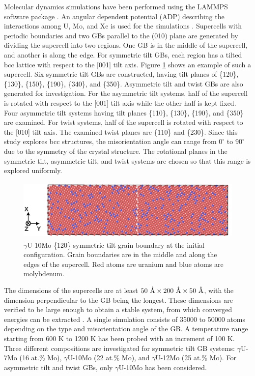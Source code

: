 \documentclass{elsarticle}
\begin{document}
Molecular dynamics simulations have been performed using the LAMMPS software package \cite{lammps}. An angular dependent potential (ADP) describing the interactions among U, Mo, and Xe is used for the simulations \cite{starikov2018, beelerUMoXe}. Supercells with periodic boundaries and two GBs parallel to the (010) plane are generated by dividing the supercell into two regions. One GB is in the middle of the supercell, and another is along the edge. For symmetric tilt GBs, each region has a tilted bcc lattice with respect to the [001] tilt axis. Figure \ref{fig:gb} shows an example of such a supercell. Six symmetric tilt GBs are constructed, having tilt planes of \{120\}, \{130\}, \{150\}, \{190\}, \{340\}, and \{350\}. Asymmetric tilt and twist GBs are also generated for investigation. For the asymmetric tilt systems, half of the supercell is rotated with respect to the [001] tilt axis while the other half is kept fixed. Four asymmetric tilt systems having tilt planes \{110\}, \{130\}, \{190\}, and \{350\} are examined. For twist systems, half of the supercell is rotated with respect to the [010] tilt axis. The examined twist planes are \{110\} and \{230\}. Since this study explores bcc structures, the misorientation angle can range from $0^{\circ}$ to $90^{\circ}$ due to the symmetry of the crystal structure. The rotational planes in the symmetric tilt, asymmetric tilt, and twist systems are chosen so that this range is explored uniformly.

\begin{figure}[!ht]
\centering
\includegraphics[height=3cm]{configuration.png}
\caption{$\gamma$U-10Mo \{120\} symmetric tilt grain boundary at the initial configuration. Grain boundaries are in the middle and along the edges of the supercell. Red atoms are uranium and blue atoms are molybdenum.}
\label{fig:gb}
\end{figure}

The dimensions of the supercells are at least $50 \text{ \r{A}} \times 200 \text{ \r{A}} \times 50 \text{ \r{A}}$, with the dimension perpendicular to the GB being the longest. These dimensions are verified to be large enough to obtain a stable system, from which converged energies can be extracted \cite{beeler2018}. A single simulation consists of 35000 to 50000 atoms depending on the type and misorientation angle of the GB. A temperature range starting from 600 K to 1200 K has been probed with an increment of 100 K. Three different compositions are investigated for symmetric tilt GB systems: $\gamma$U-7Mo (16 at.\% Mo), $\gamma$U-10Mo (22 at.\% Mo), and $\gamma$U-12Mo (25 at.\% Mo). For asymmetric tilt and twist GBs, only $\gamma$U-10Mo has been considered.
\end{document}

